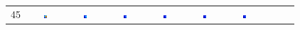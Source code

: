 \documentclass[12pt]{article}
\begin{document}
\begin{tabular}{||c | c c c c c c c c||}
        45 &
        \includegraphics[width=0.085\textwidth]{45STD_BAND-0-3.75.eps} &
        \includegraphics[width=0.085\textwidth]{45STD_BAND-3.75-7.5.eps} &
        \includegraphics[width=0.085\textwidth]{45STD_BAND-7.5-11.25.eps} &
        \includegraphics[width=0.085\textwidth]{45STD_BAND-11.25-15.eps} &
        \includegraphics[width=0.085\textwidth]{45STD_BAND-15-18.75.eps} &
        \includegraphics[width=0.085\textwidth]{45STD_BAND-18.75-22.5.eps} &
        ~ &
        ~ \\


\end{tabular}
\end{document}
